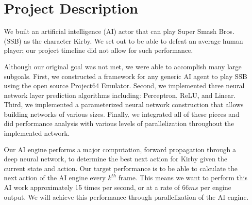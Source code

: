 \chapter*{Project Description}

We built an artificial intelligence (AI) actor that can play Super Smash Bros. (SSB) as the character Kirby.
We set out to be able to defeat an average human player; our project timeline did not allow for such performance.

Although our original goal was not met, we were able to accomplish many large subgoals. 
First, we constructed a framework for any generic AI agent to play SSB using the open source Project64 Emulator.
Second, we implemented three neural network layer prediction algorithms including: Perceptron, ReLU, and Linear. 
Third, we implemented a parameterized neural network construction that allows building networks of various sizes.
Finally, we integrated all of these pieces and did performance analysis with various levels of parallelization throughout the implemented network.

Our AI engine performs a major computation, forward propagation through a deep neural network, to determine the best next action for Kirby given the current state and action. 
Our target performance is to be able to calculate the next action of the AI engine every $k^{th}$ frame. 
This means we want to perform this AI work approximately 15 times per second, or at a rate of $66ms$ per engine output.
We will achieve this performance through parallelization of the AI engine.
